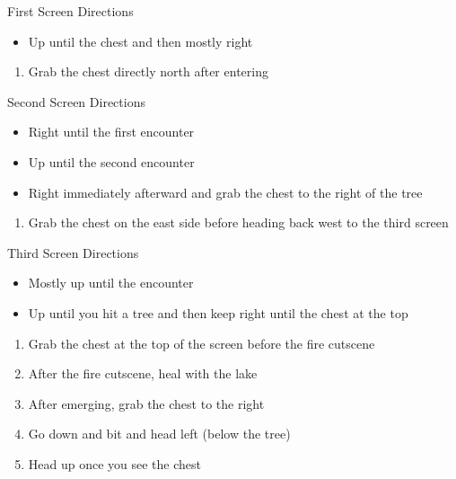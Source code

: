 \begin{paracol}{2}
\begin{misc}{First Screen Directions}
    \begin{itemize}
        \item Up until the chest and then mostly right
    \end{itemize}
\end{misc}

\begin{enumerate}[resume]
    \item Grab the  chest directly north after entering
\end{enumerate}

\begin{misc}{Second Screen Directions}
    \begin{itemize}
        \item Right until the first encounter
        \item Up until the second encounter 
        \item Right immediately afterward and grab the chest to the right of the tree
    \end{itemize}
\end{misc}

\begin{enumerate}[resume]
    \item Grab the  chest on the east side before heading back west to the third screen
\end{enumerate}

\begin{misc}{Third Screen Directions}
    \begin{itemize}
        \item Mostly up until the encounter
        \item Up until you hit a tree and then keep right until the chest at the top
    \end{itemize}
\end{misc}

\begin{enumerate}[resume]
    \item Grab the  chest at the top of the screen before the fire cutscene
    \item After the fire cutscene, heal with the lake
    \item After emerging, grab the  chest to the right
    \item Go down and bit and head left (below the tree)
    \item Head up once you see the chest
\end{enumerate}


\end{paracol}
